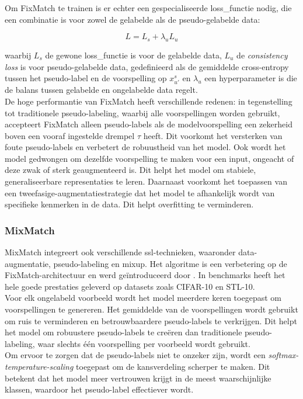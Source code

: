 Om FixMatch te trainen is er echter een gespecialiseerde \gls{loss_functie} nodig, die een combinatie is voor zowel de gelabelde als de pseudo-gelabelde data:

$$
L = L_s + \lambda_u L_u
$$

waarbij $L_s$ de gewone \gls{loss_functie} is voor de gelabelde data, $L_u$ de \emph{consistency loss} is voor pseudo-gelabelde data, gedefinieerd als de gemiddelde cross-entropy tussen het pseudo-label en de voorspelling op $x_{u'}^s$ en $\lambda_u$ een hyperparameter is die de balans tussen gelabelde en ongelabelde data regelt. \\

De hoge performantie van FixMatch heeft verschillende redenen: in tegenstelling tot traditionele pseudo-labeling, waarbij alle voorspellingen worden gebruikt, accepteert FixMatch alleen pseudo-labels als de modelvoorspelling een zekerheid boven een vooraf ingestelde drempel $\tau$ heeft. Dit voorkomt het versterken van foute pseudo-labels en verbetert de robuustheid van het model. Ook wordt het model gedwongen om dezelfde voorspelling te maken voor een input, ongeacht of deze zwak of sterk geaugmenteerd is. Dit helpt het model om stabiele, generaliseerbare representaties te leren. Daarnaast voorkomt het toepassen van een tweefasige-augmentatiestrategie dat het model te afhankelijk wordt van specifieke kenmerken in de data. Dit helpt overfitting te verminderen.

\subsubsection{MixMatch}

MixMatch integreert ook verschillende \gls{ssl}-technieken, waaronder data-augmentatie, pseudo-labeling en mixup. Het algoritme is een verbetering op de FixMatch-architectuur en werd geïntroduceerd door \textcite{Berthelot_2019}. In benchmarks heeft het hele goede prestaties geleverd op datasets zoals CIFAR-10 en STL-10. \\

Voor elk ongelabeld voorbeeld wordt het model meerdere keren toegepast om voorspellingen te genereren. Het gemiddelde van de voorspellingen wordt gebruikt om ruis te verminderen en betrouwbaardere pseudo-labels te verkrijgen. Dit helpt het model om robuustere pseudo-labels te creëren dan traditionele pseudo-labeling, waar slechts één voorspelling per voorbeeld wordt gebruikt. \\

Om ervoor te zorgen dat de pseudo-labels niet te onzeker zijn, wordt een \emph{softmax-temperature-scaling} toegepast om de kansverdeling scherper te maken. Dit betekent dat het model meer vertrouwen krijgt in de meest waarschijnlijke klassen, waardoor het pseudo-label effectiever wordt.

